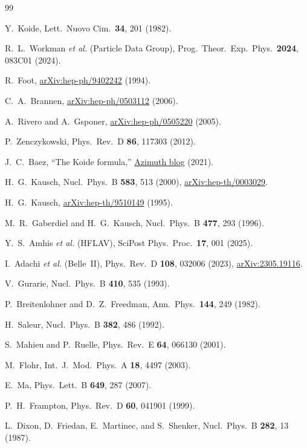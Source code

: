 \documentclass[aps,prl,twocolumn,superscriptaddress]{revtex4-2}
\begin{document}
\begin{thebibliography}{99}

Y.~Koide, Lett.\ Nuovo Cim.\ \textbf{34}, 201 (1982).

R.~L.~Workman \emph{et al.} (Particle Data Group),
Prog.\ Theor.\ Exp.\ Phys.\ \textbf{2024}, 083C01 (2024).

R.~Foot, \href{https://arxiv.org/abs/hep-ph/9402242}{arXiv:hep-ph/9402242} (1994).

C.~A.~Brannen, \href{https://arxiv.org/abs/hep-ph/0503112}{arXiv:hep-ph/0503112} (2006).

A.~Rivero and A.~Gsponer,
\href{https://arxiv.org/abs/hep-ph/0505220}{arXiv:hep-ph/0505220} (2005).

P.~Zenczykowski, Phys.\ Rev.\ D \textbf{86}, 117303 (2012).

J.~C.~Baez, ``The Koide formula,''
\href{https://johncarlosbaez.wordpress.com/2021/04/04/the-koide-formula/}{Azimuth blog} (2021).

H.~G.~Kausch, Nucl.\ Phys.\ B \textbf{583}, 513 (2000),
\href{https://arxiv.org/abs/hep-th/0003029}{arXiv:hep-th/0003029}.

H.~G.~Kausch, \href{https://arxiv.org/abs/hep-th/9510149}{arXiv:hep-th/9510149} (1995).

M.~R.~Gaberdiel and H.~G.~Kausch,
Nucl.\ Phys.\ B \textbf{477}, 293 (1996).

Y.~S.~Amhis \emph{et al.} (HFLAV),
SciPost Phys.\ Proc.\ \textbf{17}, 001 (2025).

I.~Adachi \emph{et al.} (Belle~II),
Phys.\ Rev.\ D \textbf{108}, 032006 (2023),
\href{https://arxiv.org/abs/2305.19116}{arXiv:2305.19116}.

V.~Gurarie, Nucl.\ Phys.\ B \textbf{410}, 535 (1993).

P.~Breitenlohner and D.~Z.~Freedman,
Ann.\ Phys.\ \textbf{144}, 249 (1982).

H.~Saleur, Nucl.\ Phys.\ B \textbf{382}, 486 (1992).

S.~Mahieu and P.~Ruelle,
Phys.\ Rev.\ E \textbf{64}, 066130 (2001).

M.~Flohr, Int.\ J.\ Mod.\ Phys.\ A \textbf{18}, 4497 (2003).

E.~Ma, Phys.\ Lett.\ B \textbf{649}, 287 (2007).

P.~H.~Frampton, Phys.\ Rev.\ D \textbf{60}, 041901 (1999).

L.~Dixon, D.~Friedan, E.~Martinec, and S.~Shenker,
Nucl.\ Phys.\ B \textbf{282}, 13 (1987).

\end{thebibliography}
\end{document}
